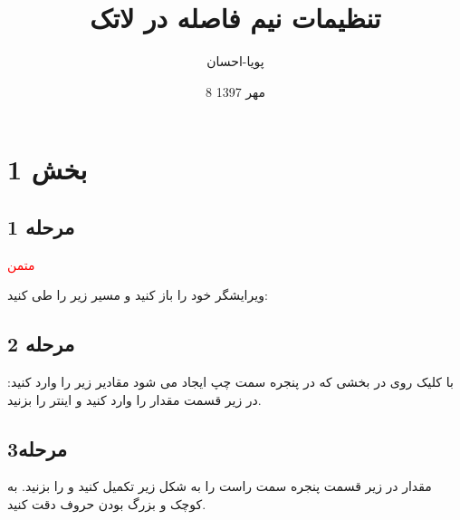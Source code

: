 \documentclass[12pts]{book}
\title{ تنظیمات نیم فاصله در لاتک}
\author{پویا-احسان}
\date{8 مهر 1397}
\begin{document}
	\maketitle
	\section{بخش 1}
	\subsection{مرحله 1}
	\textcolor{red}{متمن}
	

	ويرايشگر
	خود را باز کنيد و مسير زير را طی کنيد:
\subsection{مرحله 2}
		
	
	  با کليک روی
	  در بخشی که در پنجره سمت چپ ايجاد می شود مقادير زير را وارد کنيد:
	  \newline
	 در زير قسمت
	مقدار 
	را وارد کنيد و اينتر را بزنيد.
\subsection{مرحله3}
	مقدار
	  در زير قسمت
	پنجره سمت راست را به شکل زير تکميل کنيد و
	را بزنيد. 
	\newline
	به کوچک و بزرگ بودن حروف دقت کنید.

\end{document}
